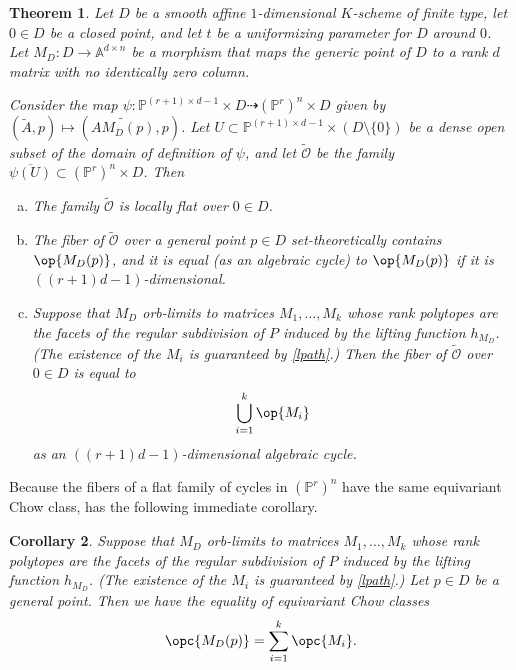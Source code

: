 \documentclass[12pt]{amsart}
\newcommand{\mb}{\mathbb}
\newcommand{\mc}{\mathcal}
\newcommand{\wt}{\widetilde}
\theoremstyle{plain}
\newtheorem{Thm}{Theorem}[section]
\newtheorem{Cor}[Thm]{Corollary}
\theoremstyle{definition}
\theoremstyle{remark}
\begin{document}
\begin{Thm}\label{degenerationfibers}
Let $D$ be a smooth affine $1$-dimensional $K$-scheme of finite type, let $0 \in D$ be a closed point, and let $t$ be a uniformizing parameter for $D$ around $0$. Let $M_D : D \to \mb{A}^{d \times n}$ be a morphism that maps the generic point of $D$ to a rank $d$ matrix with no identically zero column.

Consider the map $\psi: \mb{P}^{(r+1)\times d-1}\times D \dashrightarrow (\mb{P}^r)^n\times D$ given by $(\widetilde A,p) \mapsto (\widetilde{AM_D(p)},p)$. Let $U\subset \mb{P}^{(r+1)\times d-1}\times (D \setminus \{0\})$ be a dense open subset of the domain of definition of $\psi$, and let $\wt{\mc{O}}$ be the family $\overline{\psi(U)} \subset (\mb{P}^{r})^n\times D$. Then
\begin{enumerate}[(a)]
\item The family $\wt{\mc{O}}$ is locally flat over $0 \in D$.
\item The fiber of $\wt{\mc{O}}$ over a general point $p \in D$ set-theoretically contains $\op{M_D(p)}$, and it is equal (as an algebraic cycle) to $\op{M_D(p)}$ if it is $((r+1)d-1)$-dimensional.
\item Suppose that $M_D$ orb-limits to matrices $M_1, \ldots, M_k$ whose rank polytopes are the facets of the regular subdivision of $P$ induced by the lifting function $h_{M_D}$. (The existence of the $M_i$ is guaranteed by \cref{lpath}.) Then the fiber of $\wt{\mc{O}}$ over $0 \in D$ is equal to
\[\bigcup_{i=1}^{k}\op{M_i}\]
as an $((r+1)d-1)$-dimensional algebraic cycle.
\end{enumerate}
\end{Thm}

Because the fibers of a flat family of cycles in $(\mb{P}^r)^n$ have the same equivariant Chow class,  has the following immediate corollary.

\begin{Cor}\label{siorbit}
Suppose that $M_D$ orb-limits to matrices $M_1, \ldots, M_k$ whose rank polytopes are the facets of the regular subdivision of $P$ induced by the lifting function $h_{M_D}$. (The existence of the $M_i$ is guaranteed by \cref{lpath}.) Let $p\in D$ be a general point. Then we have the equality of equivariant Chow classes
\begin{align*}
\opc{M_D(p)}=\sum_{i=1}^{k}\opc{M_i}.
\end{align*}
\end{Cor}
\end{document}
